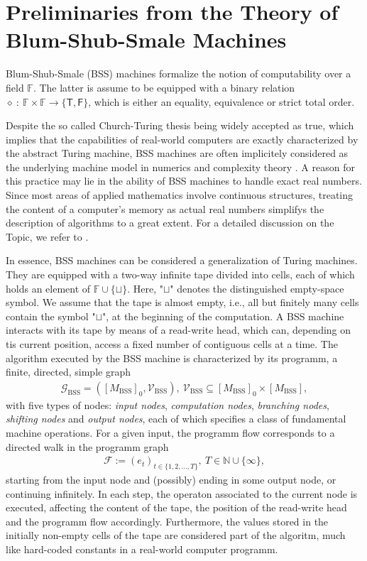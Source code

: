 \documentclass[conference]{IEEEtran}
\def\G{{\mathcal G}}
\def\V{{\mathcal V}}
\def\F{{\mathcal F}}
\def\NN{{\mathbb N}}
\def\FF{{\mathbb F}}
\newcommand{\BSS}{\mathrm{BSS}}
\newcommand{\sdummy}{{\color{red}[SOURCE]}}
\newcommand{\tbr}[1]{}
\begin{document}
\section{Preliminaries from the Theory of Blum-Shub-Smale Machines}	\label{sec:PreliminariesBSS}	    	
	\noindent Blum-Shub-Smale (BSS) machines formalize the notion of computability over a field \(\FF\). The latter is assume to be equipped 
	with a binary relation \(\diamond~{:}~\FF \times \FF \rightarrow \{\mathsf{T},\mathsf{F}\}\), which is either an equality, equivalence or strict total order. 
	
	Despite the so called Church-Turing thesis being widely accepted as true, which implies that the capabilities of real-world computers are exactly characterized 
	by the abstract Turing machine, BSS machines are often implicitely considered as the underlying machine model in numerics and complexity theory \tbr{\sdummy}. 
	A reason for this practice may lie in the ability of BSS machines to handle exact real numbers. Since most areas of applied mathematics involve continuous structures, 
	treating the content of a computer's memory as actual real numbers simplifys the description of algorithms to a great extent. For a detailed discussion on the Topic, we refer to \cite{Bl04}.

	In essence, BSS machines can be considered a generalization of Turing machines. They are equipped with a two-way infinite tape divided into cells, each of which holds an 
	element of \(\FF\cup\{\sqcup\}\). Here, "\(\sqcup\)" denotes the distinguished empty-space symbol. We assume that the tape is almost empty, i.e., all but finitely many cells 
	contain the symbol "\(\sqcup\)", at the beginning of the computation. A BSS machine interacts with its tape by means of a read-write head, which can, depending on tis current 
	position, access a fixed number of contiguous cells at a time. The algorithm executed by the BSS machine is characterized by its programm, a finite, directed, simple graph 
	\begin{align*}   \G_\BSS = ([M_\BSS]_{0}, \V_\BSS),~ \V_\BSS \subseteq [M_\BSS]_{0} \times [M_\BSS],
	\end{align*} 
	with five types of nodes: \emph{input nodes}, \emph{computation nodes}, \emph{branching nodes}, \emph{shifting nodes} and \emph{output nodes}, each of which specifies a class 
	of fundamental machine operations. For a given input, the programm flow corresponds to a directed walk in the programm graph
	\begin{align*}	\F := (e_t)_{t\in\{1,2,\ldots,T\}},~T\in\NN\cup \{\infty\},
	\end{align*}
	starting from the input node and (possibly) ending in some output node, or continuing infinitely. In each step, the operaton associated to the current node is executed, 
	affecting the content of the tape, the position of the read-write head and the programm flow accordingly. Furthermore, the values stored in the initially non-empty cells 
	of the tape are considered part of the algoritm, much like hard-coded constants in a real-world computer programm. 
\end{document}
